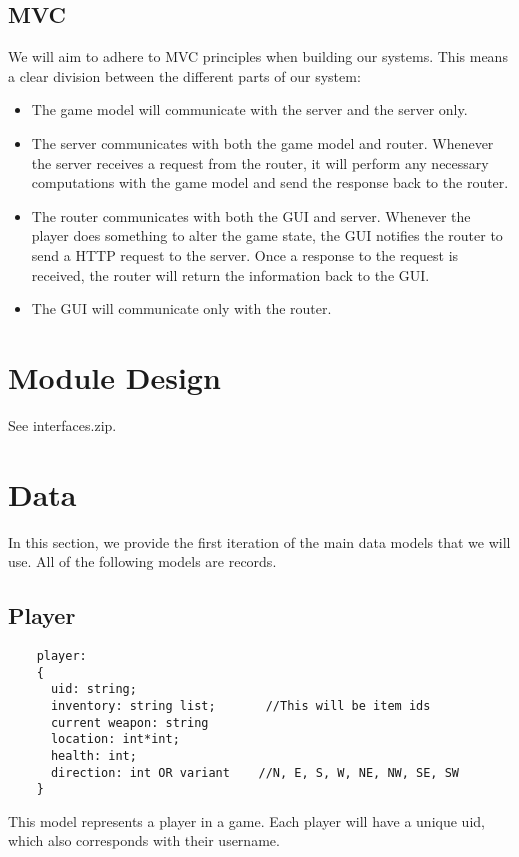 \documentclass{article}
\begin{document}
	\subsection{MVC}
	We will aim to adhere to MVC principles when building our systems. This means a clear division between the different parts of our system:
	\begin{itemize}
		\item The game model will communicate with the server and the server only.
		\item The server communicates with both the game model and router. Whenever the server receives a request from the router, it will perform any necessary computations with the game model and send the response back to the router.
		\item The router communicates with both the GUI and server. Whenever the player does something to alter the game state, the GUI notifies the router to send a HTTP request to the server. Once a response to the request is received, the router will return the information back to the GUI.
		\item The GUI will communicate only with the router.
	\end{itemize}

    \section{Module Design}

        See interfaces.zip.

    \section{Data}
    	In this section, we provide the first iteration of the main data models that we will use. All of the following models are records.

	\subsection{Player}
	\begin{verbatim}
	player:
	{
	  uid: string;
	  inventory: string list;    	//This will be item ids
	  current weapon: string
	  location: int*int;
	  health: int;
	  direction: int OR variant    //N, E, S, W, NE, NW, SE, SW
	}
	\end{verbatim}
	This model represents a player in a game. Each player will have a unique uid, which also corresponds with their username.
\end{document}
